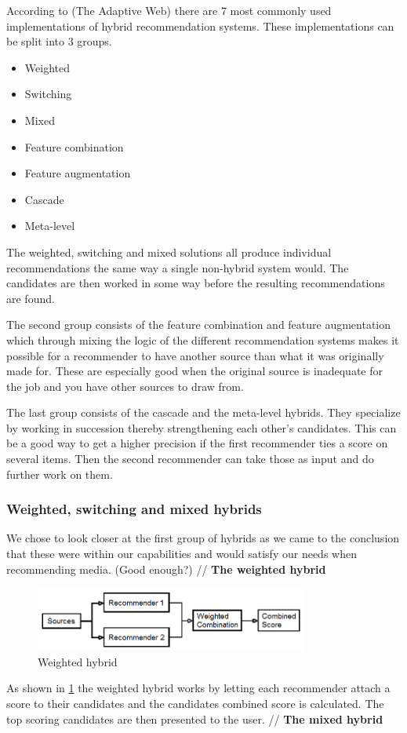 According to (The Adaptive Web) there are 7 most commonly used implementations of hybrid recommendation systems. These implementations can be split into 3 groups.

\begin{itemize}
\item Weighted
\item Switching
\item Mixed
\item Feature combination
\item Feature augmentation
\item Cascade
\item Meta-level
\end{itemize}

The weighted, switching and mixed solutions all produce individual recommendations the same way a single non-hybrid system would. The candidates are then worked in some way before the resulting recommendations are found.

The second group consists of the feature combination and feature augmentation which through mixing the logic of the different recommendation systems makes it possible for a recommender to have another source than what it was originally made for. These are especially good when the original source is inadequate for the job and you have other sources to draw from.

The last group consists of the cascade and the meta-level hybrids. They specialize by working in succession thereby strengthening each other's candidates. This can be a good way to get a higher precision if the first recommender ties a score on several items. Then the second recommender can take those as input and do further work on them. 

\subsubsection{Weighted, switching and mixed hybrids} 
We chose to look closer at the first group of hybrids as we came to the conclusion that these were within our capabilities and would satisfy our needs when recommending media. (Good enough?)
//
\textbf{The weighted hybrid}

\begin{figure}[H]
\centering
\includegraphics[width=0.8\textwidth]{Images/Weightedhybrid.png}
\caption{Weighted hybrid}
\label{Weighted}
\end{figure}
As shown in \ref{Weighted} the weighted hybrid works by letting each recommender attach a score to their candidates and the candidates combined score is calculated. The top scoring candidates are then presented to the user. 
//
\textbf{The mixed hybrid}

